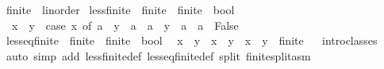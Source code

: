 \begin{isabellebody}
\endisatagproof
{\isafoldproof}%
%
\isadelimproof
\isanewline
%
\endisadelimproof
\isanewline
{}\isamarkupfalse%
\ finite{\isacharunderscore}{\kern0pt}{}\ {\isacharcolon}{\kern0pt}{\isacharcolon}{\kern0pt}\ linorder\isanewline
{}\isanewline
\isanewline
{}\isamarkupfalse%
\ less{\isacharunderscore}{\kern0pt}finite{\isacharunderscore}{\kern0pt}{}\ {\isacharcolon}{\kern0pt}{\isacharcolon}{\kern0pt}\ {\isachardoublequoteopen}finite{\isacharunderscore}{\kern0pt}{}\ {\isasymRightarrow}\ finite{\isacharunderscore}{\kern0pt}{}\ {\isasymRightarrow}\ bool{\isachardoublequoteclose}\isanewline
{}\isanewline
\ \ {\isachardoublequoteopen}x\ {\isacharless}{\kern0pt}\ y\ {\isacharequal}{\kern0pt}\ {\isacharparenleft}{\kern0pt}case\ x\ of\ a\ {\isasymRightarrow}\ y\ {\isasymnoteq}\ a\ {\isacharbar}{\kern0pt}\ a\ {\isasymRightarrow}\ y\ {\isacharequal}{\kern0pt}\ a\ {\isacharbar}{\kern0pt}\ a\ {\isasymRightarrow}\ False{\isacharparenright}{\kern0pt}{\isachardoublequoteclose}\isanewline
\isanewline
{}\isamarkupfalse%
\ less{\isacharunderscore}{\kern0pt}eq{\isacharunderscore}{\kern0pt}finite{\isacharunderscore}{\kern0pt}{}\ {\isacharcolon}{\kern0pt}{\isacharcolon}{\kern0pt}\ {\isachardoublequoteopen}finite{\isacharunderscore}{\kern0pt}{}\ {\isasymRightarrow}\ finite{\isacharunderscore}{\kern0pt}{}\ {\isasymRightarrow}\ bool{\isachardoublequoteclose}\isanewline
{}\isanewline
\ \ {\isachardoublequoteopen}x\ {\isasymle}\ y\ {\isasymlongleftrightarrow}\ x\ {\isacharequal}{\kern0pt}\ y\ {\isasymor}\ x\ {\isacharless}{\kern0pt}\ {\isacharparenleft}{\kern0pt}y\ {\isacharcolon}{\kern0pt}{\isacharcolon}{\kern0pt}\ finite{\isacharunderscore}{\kern0pt}{}{\isacharparenright}{\kern0pt}{\isachardoublequoteclose}\isanewline
\isanewline
{}\isamarkupfalse%
%
\isadelimproof
\ %
\endisadelimproof
%
\isatagproof
{}\isamarkupfalse%
\ {\isacharparenleft}{\kern0pt}intro{\isacharunderscore}{\kern0pt}classes{\isacharparenright}{\kern0pt}\isanewline
{}\isamarkupfalse%
\ {\isacharparenleft}{\kern0pt}auto\ simp\ add{\isacharcolon}{\kern0pt}\ less{\isacharunderscore}{\kern0pt}finite{\isacharunderscore}{\kern0pt}{}{\isacharunderscore}{\kern0pt}def\ less{\isacharunderscore}{\kern0pt}eq{\isacharunderscore}{\kern0pt}finite{\isacharunderscore}{\kern0pt}{}{\isacharunderscore}{\kern0pt}def\ split{\isacharcolon}{\kern0pt}\ finite{\isacharunderscore}{\kern0pt}{}{\isachardot}{\kern0pt}split{\isacharunderscore}{\kern0pt}asm{\isacharparenright}{\kern0pt}%

\end{isabellebody}
